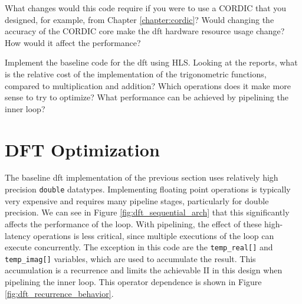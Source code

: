 
\begin{exercise}
What changes would this code require if you were to use a CORDIC that you designed, for example, from Chapter \ref{chapter:cordic}? Would changing the accuracy of the CORDIC core make the \gls{dft} hardware resource usage change? How would it affect the performance? 
\end{exercise}

\begin{exercise}
Implement the baseline code for the \gls{dft} using HLS.  Looking at the reports, what is the relative cost of the implementation of the trigonometric functions, compared to multiplication and addition?  Which operations does it make more sense to try to optimize?  What performance can be achieved by pipelining the inner loop?
\end{exercise}

\section{DFT Optimization}
\label{subsec:dft_optimization}

The baseline \gls{dft} implementation of the previous section uses relatively high precision \lstinline|double| datatypes.  Implementing floating point operations is typically very expensive and requires many pipeline stages, particularly for double precision.  We can see in Figure \ref{fig:dft_sequential_arch} that this significantly affects the performance of the loop.  With pipelining, the effect of these high-latency operations is less critical, since multiple executions of the loop can execute concurrently.  The exception in this code are the \lstinline|temp_real[]| and \lstinline|temp_imag[]| variables, which are used to accumulate the result.  This accumulation is a \gls{recurrence} and limits the achievable II in this design when pipelining the inner loop.   This operator dependence is shown in Figure \ref{fig:dft_recurrence_behavior}.

